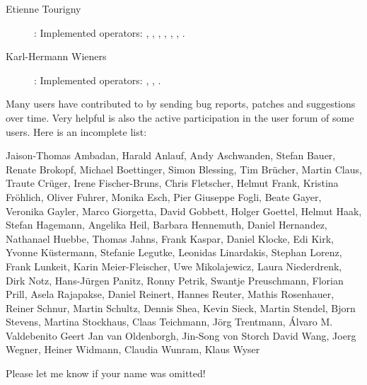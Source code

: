 \begin{description}
\item[Etienne Tourigny]: Implemented operators:  {}, {},
 {}, {}, {}, {}, {}.

\item[Karl-Hermann Wieners]: Implemented operators: {},  {},  {}.
\end{description}







Many users have contributed to {\CDO} by sending bug reports, patches
and suggestions over time.
Very helpful is also the active participation in the user forum of some users.
Here is an incomplete list:

Jaison-Thomas Ambadan,
Harald Anlauf,
Andy Aschwanden,
Stefan Bauer,
Renate Brokopf,
Michael Boettinger,
Simon Blessing,
Tim Br\"ucher,
Martin Claus,
Traute Cr\"uger,
Irene Fischer-Bruns,
Chris Fletscher,
Helmut Frank,
Kristina Fr\"ohlich,
Oliver Fuhrer,
Monika Esch,
Pier Giuseppe Fogli,
Beate Gayer,
Veronika Gayler,
Marco Giorgetta,
David Gobbett,
Holger Goettel,
Helmut Haak,
Stefan Hagemann,
Angelika Heil,
Barbara Hennemuth,
Daniel Hernandez,
Nathanael Huebbe,
Thomas Jahns,
Frank Kaspar,
Daniel Klocke,
Edi Kirk,
Yvonne K\"ustermann,
Stefanie Legutke,
Leonidas Linardakis,
Stephan Lorenz,
Frank Lunkeit,
Karin Meier-Fleischer,
Uwe Mikolajewicz,
Laura Niederdrenk,
Dirk Notz,
Hans-J\"urgen Panitz,
Ronny Petrik,
Swantje Preuschmann,
Florian Prill,
Asela Rajapakse,
Daniel Reinert,
Hannes Reuter,
Mathis Rosenhauer,
Reiner Schnur,
Martin Schultz,
Dennis Shea,
Kevin Sieck,
Martin Stendel,
Bjorn Stevens,
Martina Stockhaus,
Claas Teichmann,
J\"org Trentmann,
\'Alvaro M. Valdebenito
Geert Jan van Oldenborgh,
Jin-Song von Storch
David Wang,
Joerg Wegner,
Heiner Widmann,
Claudia Wunram,
Klaus Wyser

Please let me know if your name was omitted!
